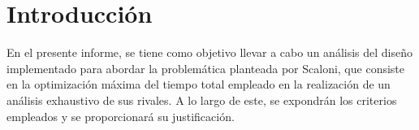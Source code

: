 \section{Introducción}

En el presente informe, se tiene como objetivo llevar a cabo un análisis del diseño 
implementado para abordar la problemática planteada por Scaloni, que consiste en la 
optimización máxima del tiempo total empleado en la realización de un análisis exhaustivo 
de sus rivales. A lo largo de este, se expondrán los criterios empleados y se proporcionará 
su justificación.
